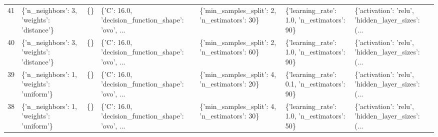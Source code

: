 \begin{tabular}{lllllll}
41  &  \{'n\_neighbors': 3, 'weights': 'distance'\} &  \{\} &  \{'C': 16.0, 'decision\_function\_shape': 'ovo', ... &  \{'min\_samples\_split': 2, 'n\_estimators': 30\} &  \{'learning\_rate': 1.0, 'n\_estimators': 90\} &  \{'activation': 'relu', 'hidden\_layer\_sizes': (... \\
40  &  \{'n\_neighbors': 3, 'weights': 'distance'\} &  \{\} &  \{'C': 16.0, 'decision\_function\_shape': 'ovo', ... &  \{'min\_samples\_split': 2, 'n\_estimators': 60\} &  \{'learning\_rate': 1.0, 'n\_estimators': 90\} &  \{'activation': 'relu', 'hidden\_layer\_sizes': (... \\
39  &   \{'n\_neighbors': 1, 'weights': 'uniform'\} &  \{\} &  \{'C': 16.0, 'decision\_function\_shape': 'ovo', ... &  \{'min\_samples\_split': 4, 'n\_estimators': 20\} &  \{'learning\_rate': 0.1, 'n\_estimators': 90\} &  \{'activation': 'relu', 'hidden\_layer\_sizes': (... \\
38  &   \{'n\_neighbors': 1, 'weights': 'uniform'\} &  \{\} &  \{'C': 16.0, 'decision\_function\_shape': 'ovo', ... &  \{'min\_samples\_split': 4, 'n\_estimators': 30\} &  \{'learning\_rate': 1.0, 'n\_estimators': 50\} &  \{'activation': 'relu', 'hidden\_layer\_sizes': (... \\
\bottomrule
\end{tabular}
